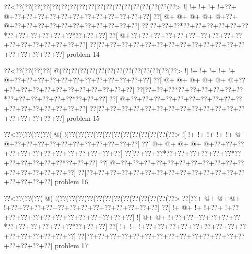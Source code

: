 \vbox{\vbox{\goo
\0??<\0??(\0??(\0??(\0??(\0??(\0??(\0??(\0??(\0??(\0??(\0??(\0??(\0??(\0??(\0??(\0??(\0??(\0??>
\- ![\- !+\- !+\- !+\- !+\0??+\- @+\0??+\0??+\0??+\0??+\0??+\0??+\0??+\0??+\0??+\0??+\0??+\0??]
\0??[\- @+\- @+\- @+\- @+\- @+\0??+\- @+\0??+\0??+\0??+\0??+\0??+\0??+\0??+\0??+\0??+\0??+\0??]
\0??[\0??+\0??+\0??*\0??+\0??+\0??+\0??+\0??+\0??*\0??+\0??+\0??+\0??+\0??+\0??*\0??+\0??+\0??]
\0??[\- @+\0??+\0??+\0??+\0??+\0??+\0??+\0??+\0??+\0??+\0??+\0??+\0??+\0??+\0??+\0??+\0??+\0??]
\0??[\0??+\0??+\0??+\0??+\0??+\0??+\0??+\0??+\0??+\0??+\0??+\0??+\0??+\0??+\0??+\0??+\0??+\0??]
}
\hfil problem 14\hfil\break
}



\vbox{\vbox{\goo
\0??<\0??(\0??(\0??(\0??(\- @(\0??(\0??(\0??(\0??(\0??(\0??(\0??(\0??(\0??(\0??(\0??(\0??(\0??>
\- ![\- !+\- !+\- !+\- !+\- !+\- @+\0??+\0??+\0??+\0??+\0??+\0??+\0??+\0??+\0??+\0??+\0??+\0??]
\0??[\- @+\- @+\- @+\- @+\- @+\- @+\0??+\0??+\0??+\0??+\0??+\0??+\0??+\0??+\0??+\0??+\0??+\0??]
\0??[\0??+\0??+\0??*\0??+\0??+\0??+\0??+\0??+\0??*\0??+\0??+\0??+\0??+\0??+\0??*\0??+\0??+\0??]
\0??[\- @+\0??+\0??+\0??+\0??+\0??+\0??+\0??+\0??+\0??+\0??+\0??+\0??+\0??+\0??+\0??+\0??+\0??]
\0??[\0??+\0??+\0??+\0??+\0??+\0??+\0??+\0??+\0??+\0??+\0??+\0??+\0??+\0??+\0??+\0??+\0??+\0??]
}
\hfil problem 15\hfil\break
}



\vbox{\vbox{\goo
\0??<\0??(\0??(\0??(\0??(\- @(\- !(\0??(\0??(\0??(\0??(\0??(\0??(\0??(\0??(\0??(\0??(\0??(\0??>
\- ![\- !+\- !+\- !+\- !+\- !+\- @+\- @+\0??+\0??+\0??+\0??+\0??+\0??+\0??+\0??+\0??+\0??+\0??]
\0??[\- @+\- @+\- @+\- @+\- @+\0??+\0??+\0??+\0??+\0??+\0??+\0??+\0??+\0??+\0??+\0??+\0??+\0??]
\0??[\0??+\0??+\0??*\0??+\0??+\0??+\0??+\0??+\0??*\0??+\0??+\0??+\0??+\0??+\0??*\0??+\0??+\0??]
\0??[\- @+\0??+\0??+\0??+\0??+\0??+\0??+\0??+\0??+\0??+\0??+\0??+\0??+\0??+\0??+\0??+\0??+\0??]
\0??[\0??+\0??+\0??+\0??+\0??+\0??+\0??+\0??+\0??+\0??+\0??+\0??+\0??+\0??+\0??+\0??+\0??+\0??]
}
\hfil problem 16\hfil\break
}



\vbox{\vbox{\goo
\0??<\0??(\0??(\0??(\- @(\- !(\0??(\0??(\0??(\0??(\0??(\0??(\0??(\0??(\0??(\0??(\0??(\0??(\0??>
\0??[\0??+\- @+\- @+\- @+\- !+\0??+\0??+\0??+\0??+\0??+\0??+\0??+\0??+\0??+\0??+\0??+\0??+\0??]
\0??[\- !+\- @+\- !+\- !+\0??+\- !+\0??+\0??+\0??+\0??+\0??+\0??+\0??+\0??+\0??+\0??+\0??+\0??]
\- ![\- @+\- @+\- !+\0??+\0??+\0??+\0??+\0??+\0??*\0??+\0??+\0??+\0??+\0??+\0??*\0??+\0??+\0??]
\0??[\- !+\- !+\- !+\0??+\0??+\0??+\0??+\0??+\0??+\0??+\0??+\0??+\0??+\0??+\0??+\0??+\0??+\0??]
\0??[\0??+\0??+\0??+\0??+\0??+\0??+\0??+\0??+\0??+\0??+\0??+\0??+\0??+\0??+\0??+\0??+\0??+\0??]
}
\hfil problem 17\hfil\break
}



